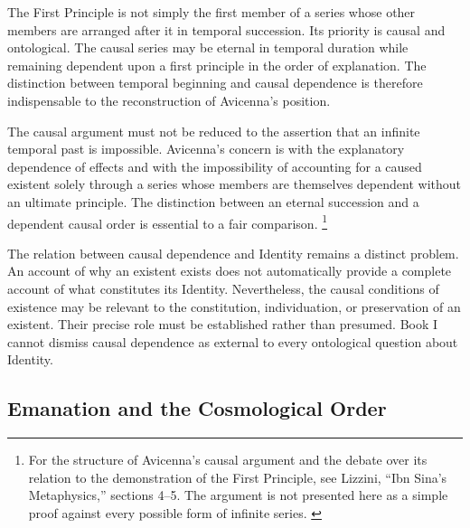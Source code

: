 The First Principle
is not simply the first
member of a series
whose other members
are arranged after
it in temporal succession.
Its priority is causal
and ontological. The
causal series may be
eternal in temporal
duration while remaining
dependent upon a first
principle in the order
of explanation. The
distinction between
temporal beginning
and causal dependence
is therefore indispensable
to the reconstruction
of Avicenna's position.
\citep[Ilahiyyat, VIII.1--3 and IX.1]{AvicennaMetaphysics}

\label{para:VS.B01.P01.C08.S13.SS10.P004}

The causal argument
must not be reduced
to the assertion that
an infinite temporal
past is impossible.
Avicenna's concern
is with the explanatory
dependence of effects
and with the impossibility
of accounting for
a caused existent
solely through a series
whose members are
themselves dependent
without an ultimate
principle. The distinction
between an eternal
succession and a
dependent causal
order is essential
to a fair comparison.
\footnote{For the structure
of Avicenna's causal
argument and the debate
over its relation to
the demonstration of
the First Principle,
see Lizzini, ``Ibn Sina's
Metaphysics,'' sections
4--5. The argument
is not presented here
as a simple proof
against every possible
form of infinite series.
\cite{LizziniIbnSinaMetaphysicsSEP2026}}

\label{para:VS.B01.P01.C08.S13.SS10.P005}

The relation between
causal dependence and
Identity remains a
distinct problem. An
account of why an
existent exists does
not automatically
provide a complete
account of what
constitutes its Identity.
Nevertheless, the
causal conditions of
existence may be
relevant to the
constitution, individuation,
or preservation of
an existent. Their
precise role must
be established rather
than presumed. Book I
cannot dismiss causal
dependence as external
to every ontological
question about Identity.



\subsection{Emanation and the Cosmological Order}
\label{subsec:ch08-avicenna-emanation-cosmology}


